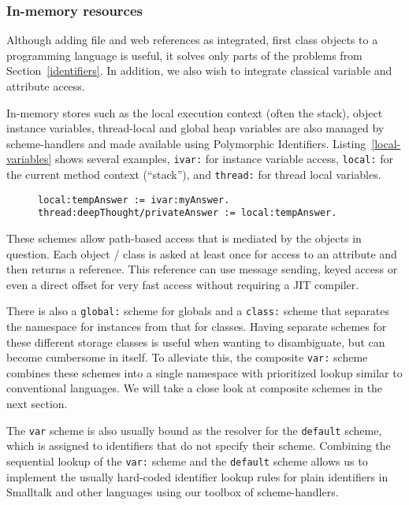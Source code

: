 \documentclass[preprint,authoryear]{llncs}
\begin{document}
\subsubsection{In-memory resources}
\label{inmemory}

Although adding file and web references as integrated, first class objects to a programming
language is useful, it solves only parts of the problems from Section~\ref{identifiers}.
In addition, we also wish to integrate classical variable and attribute access.

In-memory stores such as the local execution context (often the stack), object instance
variables, thread-local and global heap variables are also managed by scheme-handlers
and made available using Polymorphic Identifiers.  Listing~\ref{local-variables} shows
several examples, {\tt ivar:} for instance variable access, {\tt local:} for the current
method context (``stack''), and {\tt thread:} for thread local variables.

\begin{figure}[htbp]
\begin{lstlisting}[style=numbers,label=local-variables,caption=Different memory variables.]
local:tempAnswer := ivar:myAnswer.
thread:deepThought/privateAnswer := local:tempAnswer.
\end{lstlisting}
\end{figure}

These schemes allow path-based access
that is mediated by the objects in question.   Each object / class is asked at least
once for access to an attribute and then returns a reference.   This reference can
use message sending, keyed access or even a direct offset for very fast
access without requiring a JIT compiler.

There is also a {\tt global:} scheme for globals and a {\tt class:} scheme that separates
the namespace for instances from that for classes.  Having separate schemes for
these different storage classes is useful when wanting to disambiguate,
but can become cumbersome in itself.  To alleviate this, the composite
{\tt var:} scheme combines these schemes into a single namespace
with prioritized lookup similar to conventional languages.  We will take
a close look at composite schemes in the next section.  

The {\tt var} scheme is also usually bound as the resolver for the {\tt default}
scheme, which is assigned to identifiers that do not specify their scheme.
Combining the sequential lookup of the {\tt var:} scheme and the {\tt default}
scheme allows us to implement the usually hard-coded identifier lookup
rules for plain identifiers in Smalltalk and other languages using
our toolbox of scheme-handlers.
\end{document}
